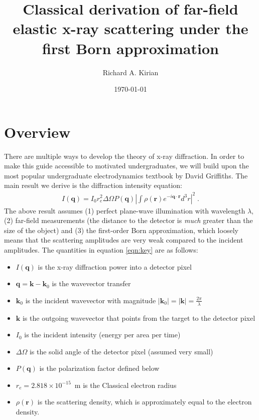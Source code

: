 \documentclass[12pt]{article}
\title{Classical derivation of far-field elastic x-ray scattering under the first Born approximation}
\author{Richard A. Kirian}
\date{\today}
\renewcommand{\vec}[1]{\boldsymbol{#1}}
\newcommand{\abs}[1]{\left| #1 \right|}
\begin{document}
\maketitle

\section{Overview}

There are multiple ways to develop the theory of x-ray diffraction.  In order to make this guide 
accessible to motivated undergraduates, we will build upon the most popular
undergraduate electrodynamics textbook by David Griffiths\cite{Griffiths2018}.  The main result we derive is
the diffraction intensity equation:
\begin{align}\label{eqn:key}
    I(\vec{q}) = I_0 r_e^2 \Delta \Omega P(\vec{q})  \abs{\int  \rho(\vec{r}) e^{-i \vec{q}\cdot\vec{r}} d^3 r }^2 \;.
\end{align}
The above result assumes (1) perfect plane-wave illumination with wavelength $\lambda$, (2) far-field measurements (the
distance to the detector is \emph{much} greater than the size of the object)
and (3) the first-order Born approximation, which loosely means that the scattering amplitudes are very weak
compared to the incident amplitudes. The quantities in equation \ref{eqn:key} are as follows:
\begin{itemize}
\item $I(\vec{q})$ is the x-ray diffraction power into a detector pixel
\item $\vec{q}=\vec{k}-\vec{k}_0$ is the wavevector transfer
\item $\vec{k}_0$ is the incident wavevector with magnitude $|\vec{k}_0| = |\vec{k}| = \frac{2\pi}{\lambda}$
\item $\vec{k}$ is the outgoing wavevector that points from the target to the detector pixel
\item $I_0$ is the incident intensity (energy per area per time)
\item $\Delta \Omega$ is the solid angle of the detector pixel (assumed very small)
\item $P(\vec{q})$ is the polarization factor defined below
\item $r_e = 2.818 \times 10^{-15}$~m is the Classical electron radius
\item $\rho(\vec{r})$ is the scattering density, which is approximately equal to the electron density.
\end{itemize}
\end{document}
